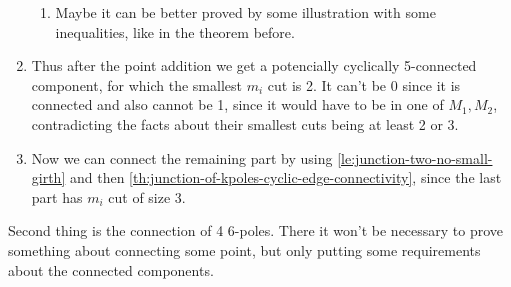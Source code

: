 \documentclass[12pt, twoside]{book}
\begin{document}
\begin{enumerate}
\begin{enumerate}
		\item Maybe it can be better proved by some illustration with some inequalities, like in the theorem before.
	\end{enumerate}
	\item Thus after the point addition we get a potencially cyclically 5-connected component, for which the smallest $m_i$ cut is 2. It can't be 0 since it is connected and also cannot be 1, since it would have to be in one of $M_1,M_2$, contradicting the facts about their smallest cuts being at least 2 or 3.
	\item Now we can connect the remaining part by using \cref{le:junction-two-no-small-girth} and then \cref{th:junction-of-kpoles-cyclic-edge-connectivity}, since the last part has $m_i$ cut of size 3.
\end{enumerate}

Second thing is the connection of 4 6-poles. There it won't be necessary to prove something about connecting some point, but only putting some requirements about the connected components. \todo{}

\newpage
\thispagestyle{empty}




\end{document}
